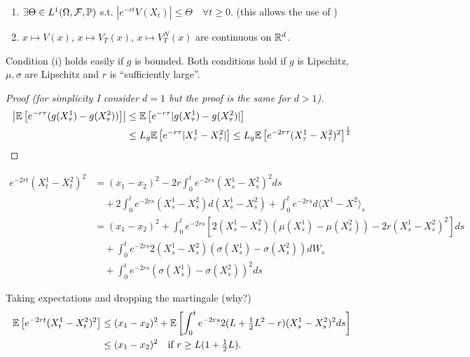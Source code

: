 \begin{enumerate}[label=(\roman*)]
    \item $\exists \Theta \in L^1(\Omega, \mathcal{F}, \mathbb P)$ s.t. $|e^{-rt} V(X_t)| \leq \Theta \quad \forall t \geq 0$. (this allows the use of )
    \item $x \mapsto V(x)$, $x \mapsto V_T(x)$, $x \mapsto V_T^N(x)$ are continuous on $\mathbb R^d$.
\end{enumerate}

\begin{remark*}[Observation]
    Condition (i) holds easily if $g$ is bounded. Both conditions hold if $g$ is Lipschitz, $\mu, \sigma$ are Lipschitz and $r$ is ``sufficiently large''.
\end{remark*}

\begin{proof}[Proof (for simplicity I consider $d=1$ but the proof is the same for $d>1$)]
    \begin{align*}
        \left| \mathbb E \left[ e^{-r\tau} (g(X_\tau^1) - g(X_\tau^2)) \right] \right| &\leq \mathbb E \left[ e^{-r\tau} |g(X_\tau^1) - g(X_\tau^2)| \right] \\
        &\leq L_g \mathbb E \left[ e^{-r\tau} |X_\tau^1 - X_\tau^2| \right] \leq L_g \mathbb E \left[ e^{-2r\tau} (X_\tau^1 - X_\tau^2)^2 \right]^{\frac{1}{2}}
    \end{align*}
\end{proof}

\begin{align*}
    e^{-2rt} (X_t^1 - X_t^2)^2 &= (x_1 - x_2)^2 - 2r \int_0^t e^{-2rs} (X_s^1 - X_s^2)^2 ds \\
    &\quad + 2 \int_0^t e^{-2rs} (X_s^1 - X_s^2) d(X_s^1 - X_s^2) + \int_0^t e^{-2rs} d\langle X^1 - X^2 \rangle_s \\
    &= (x_1 - x_2)^2 + \int_0^t e^{-2rs} \left[ 2(X_s^1 - X_s^2)(\mu(X_s^1) - \mu(X_s^2)) - 2r(X_s^1 - X_s^2)^2 \right] ds \\
    &\quad + \int_0^t e^{-2rs} 2(X_s^1 - X_s^2)(\sigma(X_s^1) - \sigma(X_s^2)) dW_s \\
    &\quad + \int_0^t e^{-2rs} (\sigma(X_s^1) - \sigma(X_s^2))^2 ds
\end{align*}

Taking expectations and dropping the martingale (why?)
\begin{align*}
    \mathbb E \left[ e^{-2rt} (X_t^1 - X_t^2)^2 \right] &\leq (x_1 - x_2)^2 + \mathbb E \left[ \int_0^t e^{-2rs} 2(L + \tfrac{1}{2} L^2 - r) (X_s^1 - X_s^2)^2 ds \right] \\
    &\leq (x_1 - x_2)^2 \quad \text{if } r \geq L(1 + \tfrac{1}{2} L).
\end{align*}

